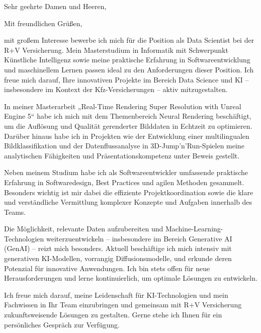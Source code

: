\documentclass[12pt,a4paper]{moderncv}
\makeatletter
\newcommand*{\subject}[1]{\def\@subject{#1}}
\makeatother
\begin{document}
\date{Würzburg, \today}%
\subject{Bewerbung als Data Scientist - ID 32608}
\opening{Sehr geehrte Damen und Heeren,}
    
\closing{Mit freundlichen Grüßen,}

\makelettertitle

mit großem Interesse bewerbe ich mich für die Position als Data Scientist bei der R+V Versicherung.
Mein Masterstudium in Informatik mit Schwerpunkt Künstliche Intelligenz sowie meine praktische Erfahrung 
in Softwareentwicklung und maschinellem Lernen passen ideal zu den Anforderungen dieser Position. 
Ich freue mich darauf, Ihre innovativen Projekte im Bereich Data Science und KI – 
insbesondere im Kontext der Kfz-Versicherungen – aktiv mitzugestalten.

In meiner Masterarbeit „Real-Time Rendering Super Resolution with Unreal Engine 5“ habe ich mich mit dem Themenbereich
Neural Rendering beschäftigt, um die Auflösung und Qualität gerenderter Bilddaten in Echtzeit zu optimieren. 
Darüber hinaus habe ich in Projekten wie der Entwicklung einer multilingualen Bildklassifikation 
und der Datenflussanalyse in 3D-Jump’n’Run-Spielen meine analytischen Fähigkeiten und 
Präsentationskompetenz unter Beweis gestellt.

Neben meinem Studium habe ich als Softwareentwickler umfassende praktische Erfahrung in Softwaredesign, 
Best Practices und agilen Methoden gesammelt. 
Besonders wichtig ist mir dabei die effiziente Projektkoordination sowie die klare und verständliche Vermittlung 
komplexer Konzepte und Aufgaben innerhalb des Teams.

Die Möglichkeit, relevante Daten aufzubereiten und Machine-Learning-Technologien weiterzuentwickeln 
– insbesondere im Bereich Generative AI (GenAI) – reizt mich besonders. 
Aktuell beschäftige ich mich intensiv mit generativen KI-Modellen, vorrangig Diffusionsmodelle, 
und erkunde deren Potenzial für innovative Anwendungen. 
Ich bin stets offen für neue Herausforderungen und lerne kontinuierlich, um optimale Lösungen zu entwickeln.

Ich freue mich darauf, meine Leidenschaft für KI-Technologien und mein Fachwissen in Ihr Team einzubringen 
und gemeinsam mit R+V Versicherung zukunftsweisende Lösungen zu gestalten. 
Gerne stehe ich Ihnen für ein persönliches Gespräch zur Verfügung.

% 

% 

%


\vspace{0.5cm}


\makeletterclosing
\end{document}
